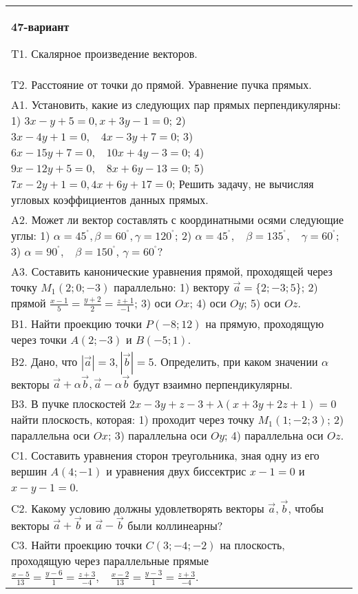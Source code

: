 \documentclass{article}
\begin{document}
\begin{tabular}{m{17cm}}
\textbf{47-вариант}
\newline

T1. 
Скалярное произведение векторов.
 \\
T2. 
Расстояние от точки до прямой. Уравнение пучка прямых.
 \\
A1. 
Установить, какие из следующих пар прямых перпендикулярны: 1) \(3x - y + 5 = 0,x + 3y - 1 = 0\); 2) \(3x - 4y + 1 = 0,\ \ \ \ 4x - 3y + 7 = 0\); 3) \(6x - 15y + 7 = 0,\ \ \ \ 10x + 4y - 3 = 0\); 4) \(9x - 12y + 5 = 0,\ \ \ \ 8x + 6y - 13 = 0\); 5) \(7x - 2y + 1 = 0,4x + 6y + 17 = 0\); Решить задачу, не вычисляя угловых коэффициентов данных прямых.
 \\
A2. Может ли вектор составлять с координатными осями следующие углы: 1) \(\alpha = 45^{{^\circ}},\beta = 60^{{^\circ}},\gamma = 120^{{^\circ}}\); 2) \(\alpha = 45^{{^\circ}},\ \ \ \ \beta = 135^{{^\circ}},\ \ \ \ \gamma = 60^{{^\circ}}\); 3) \(\alpha = 90^{{^\circ}},\ \ \ \ \beta = 150^{{^\circ}}\), \(\gamma = 60^{{^\circ}}?\)
 \\
A3. 
Составить канонические уравнения прямой, проходящей через точку \(M_{1}(2;0; - 3)\) параллельно: 1) вектору \(\overrightarrow{a} = \{ 2; - 3;5\}\); 2) прямой \(\frac{x - 1}{5} = \frac{y + 2}{2} = \frac{z + 1}{- 1}\); 3) оси \(Ox\); 4) оси \(Oy\); 5) оси \(Oz\).
 \\
B1. 
Найти проекцию точки \(P( - 8;12)\) на прямую, проходящую через точки \(A(2; - 3)\) и \(B( - 5;1)\).
 \\
B2. 
Дано, что \(|\overrightarrow{a}| = 3,|\overrightarrow{b}| = 5\). Определить, при каком значении \(\alpha\) векторы \(\overrightarrow{a} + \alpha\overrightarrow{b},\overrightarrow{a} - \alpha\overrightarrow{b}\) будут взаимно перпендикулярны.
 \\
B3. 
В пучке плоскостей \(2x - 3y + z - 3 + \lambda(x + 3y + 2z + 1) = 0\) найти плоскость, которая: 1) проходит через точку \(M_{1}(1; - 2;3)\); 2) параллельна оси \(Ox\); 3) параллельна оси \(Oy\); 4) параллельна оси \(Oz\).
 \\
C1. 
Составить уравнения сторон треугольника, зная одну из его вершин \(A(4; - 1)\) и уравнения двух биссектрис \(x - 1 = 0\) и \(x - y - 1 = 0\).
 \\
C2. 
Какому условию должны удовлетворять векторы \(\overrightarrow{a},\overrightarrow{b}\), чтобы векторы \(\overrightarrow{a} + \overrightarrow{b}\) и \(\overrightarrow{a} - \overrightarrow{b}\) были коллинеарны?
 \\
C3. 
Найти проекцию точки \(C(3; - 4; - 2)\) на плоскость, проходящую через параллельные прямые \(\frac{x - 5}{13} = \frac{y - 6}{1} = \frac{z + 3}{- 4},\ \ \ \ \frac{x - 2}{13} = \frac{y - 3}{1} = \frac{z + 3}{- 4}\).
 \\

\end{tabular}
\vspace{1cm}
\end{document}
